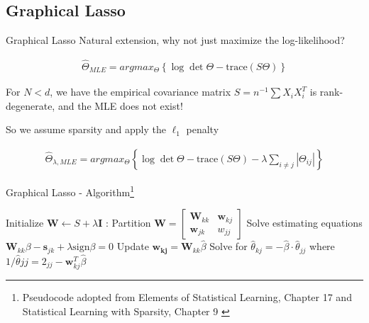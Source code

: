 \documentclass{beamer}
\begin{document}
\subsection{Graphical Lasso}

\begin{frame}{Graphical Lasso}
Natural extension, why not just maximize the log-likelihood?

\begin{gather*}
    \hat{\Theta}_{MLE}
    =
    argmax_\Theta
    \left\{
        \log \det \Theta - \text{trace}(S\Theta)
    \right\}
\end{gather*}

For $N<d$, we have the empirical covariance matrix $S = n^{-1}\sum X_i X_i^T$ is rank-degenerate, and the MLE does not exist! \cite{banerjee_model_2008} \newline 

So we assume sparsity and apply the $\ell_1$ penalty

\begin{gather*}
    \hat{\Theta}_{\lambda, MLE}
    =
    argmax_\Theta
    \left\{
        \log \det \Theta - \text{trace}(S\Theta)
        -
        \lambda \sum_{i\neq j} |\Theta_{ij}|
    \right\}
\end{gather*}

\end{frame}



\begin{frame}{Graphical Lasso - Algorithm\footnote{Pseudocode adopted from Elements of Statistical Learning, Chapter 17 \cite{hastie_elements_2009} and Statistical Learning with Sparsity, Chapter 9 \cite{hastie_statistical_2016}}}

\begin{algorithmic}[1]
    \State Initialize $\mathbf{W} \gets S + \lambda \mathbf{I}$
    :
    \State Partition $\mathbf{W} = \begin{bmatrix} \mathbf{W}_{kk} & \mathbf{w}_{kj} \\ \mathbf{w}_{jk} & w_{jj} \end{bmatrix}$
    \State Solve estimating equations $\mathbf{W}_{kk}\beta - \mathbf{s}_{jk} + \lambda \text{sign}\beta = 0$
    \State Update $\mathbf{w_{kj}} = \mathbf{W}_{kk}\hat\beta$
    \EndFor
    \State Solve for $\hat\theta_{kj} = -\hat\beta \cdot \hat\theta_{jj}$ where $1/\hat\theta{jj}=2_{jj}-\mathbf{w}_{kj}^T\hat\beta$
    \EndFor
\end{algorithmic}


\end{frame}
\end{document}
